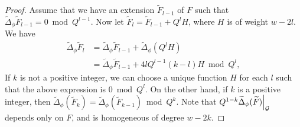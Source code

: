 \documentclass[10pt,a4paper]{amsart}
\newcommand\restr[2]{{%
  \left.\kern-\nulldelimiterspace %
  #1 %
  \right|_{#2} %
  }}
\begin{document}
\begin{proof}
Assume that we have an extension $\widetilde{F}_{l-1}$ of $F$ such that $\widetilde{\Delta}_\phi\widetilde{F}_{l-1}=0\bmod Q^{l-1}$. Now let $\widetilde{F}_l=\widetilde{F}_{l-1}+Q^l H$, where $H$ is of weight $w-2l$. We have
\begin{equation*}
\begin{aligned}
\widetilde{\Delta}_\phi\widetilde{F}_l&=\widetilde{\Delta}_\phi\widetilde{F}_{l-1}+\widetilde{\Delta}_\phi(Q^l H)\\
&=\widetilde{\Delta}_\phi\widetilde{F}_{l-1}+4lQ^{l-1}(k-l)H\bmod Q^l,
\end{aligned}
\end{equation*}
If $k$ is not a positive integer, we can choose a unique function $H$ for each $l$ such that the above expression is $0\bmod Q^l$. On the other hand, if $k$ is a positive integer, then $\widetilde{\Delta}_\phi(\widetilde{F}_k)=\widetilde{\Delta}_\phi(\widetilde{F}_{k-1}) \bmod Q^k$. Note that $\restr{Q^{1-k}\widetilde{\Delta}_\phi(\widetilde{F})}{{\mathcal{G}}}$ depends only on $F$, and is homogeneous of degree $w-2k$. 
\end{proof}
\end{document}
